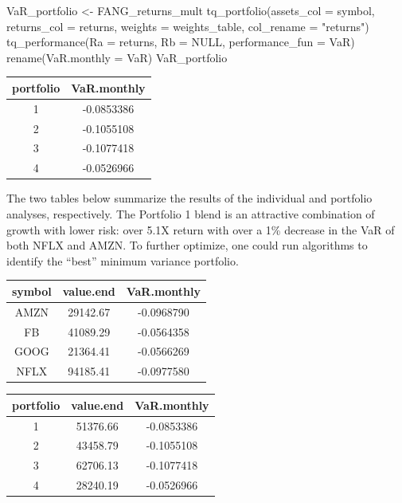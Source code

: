 \begin{Schunk}
\begin{Sinput}
VaR_portfolio <- FANG_returns_mult %
    tq_portfolio(assets_col = symbol, returns_col = returns,
                 weights = weights_table, col_rename = "returns") %
    tq_performance(Ra = returns, Rb = NULL, performance_fun = VaR) %
    rename(VaR.monthly = VaR)
VaR_portfolio
\end{Sinput}
\end{Schunk}

\begin{tabular}{cc}
\toprule
portfolio & VaR.monthly\\
\midrule
1 & -0.0853386\\
2 & -0.1055108\\
3 & -0.1077418\\
4 & -0.0526966\\
\bottomrule
\end{tabular}

\hspace{20 mm}

The two tables below summarize the results of the individual and
portfolio analyses, respectively. The Portfolio 1 blend is an attractive
combination of growth with lower risk: over 5.1X return with over a 1\%
decrease in the VaR of both NFLX and AMZN. To further optimize, one
could run algorithms to identify the ``best'' minimum variance
portfolio.

\hspace{20 mm}

\begin{tabular}{ccc}
\toprule
symbol & value.end & VaR.monthly\\
\midrule
AMZN & 29142.67 & -0.0968790\\
FB & 41089.29 & -0.0564358\\
GOOG & 21364.41 & -0.0566269\\
NFLX & 94185.41 & -0.0977580\\
\bottomrule
\end{tabular}

\hspace{20 mm}

\begin{tabular}{ccc}
\toprule
portfolio & value.end & VaR.monthly\\
\midrule
1 & 51376.66 & -0.0853386\\
2 & 43458.79 & -0.1055108\\
3 & 62706.13 & -0.1077418\\
4 & 28240.19 & -0.0526966\\
\bottomrule
\end{tabular}

